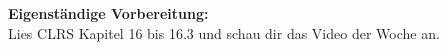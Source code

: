 \documentclass{uebung_cs}
\begin{document}
\textbf{Eigenständige Vorbereitung:}\\
Lies  CLRS Kapitel 16 bis 16.3 und schau dir das  Video der Woche an.

\begin{aufgabe}[test]
\end{aufgabe}

\begin{aufgabe}[test]
\end{aufgabe}
\end{document}
